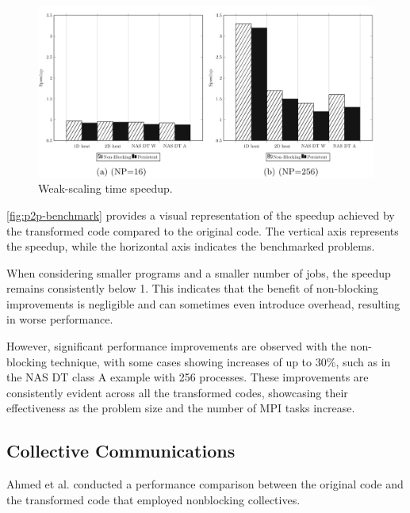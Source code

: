 \begin{figure}[!h]
    \centering
    \includegraphics[width=\textwidth]{pictures/p2p-benchmark.png}
    \caption{Weak-scaling time speedup. \cite{ahmed_petal_2016}}
    \label{fig:p2p-benchmark}
\end{figure}
\autoref{fig:p2p-benchmark} provides a visual representation of the speedup achieved by the transformed code compared to the original code. The vertical axis represents the speedup, while the horizontal axis indicates the benchmarked problems.

When considering smaller programs and a smaller number of jobs, the speedup remains consistently below 1. This indicates that the benefit of non-blocking improvements is negligible and can sometimes even introduce overhead, resulting in worse performance.

However, significant performance improvements are observed with the non-blocking technique, with some cases showing increases of up to 30\%, such as in the NAS DT class A example with 256 processes. 
These improvements are consistently evident across all the transformed codes, showcasing their effectiveness as the problem size and the number of MPI tasks increase.
\subsection{Collective Communications}
Ahmed et al. \cite{ahmed_transforming_2017} conducted a performance comparison between the original code and the transformed code that employed nonblocking collectives.

